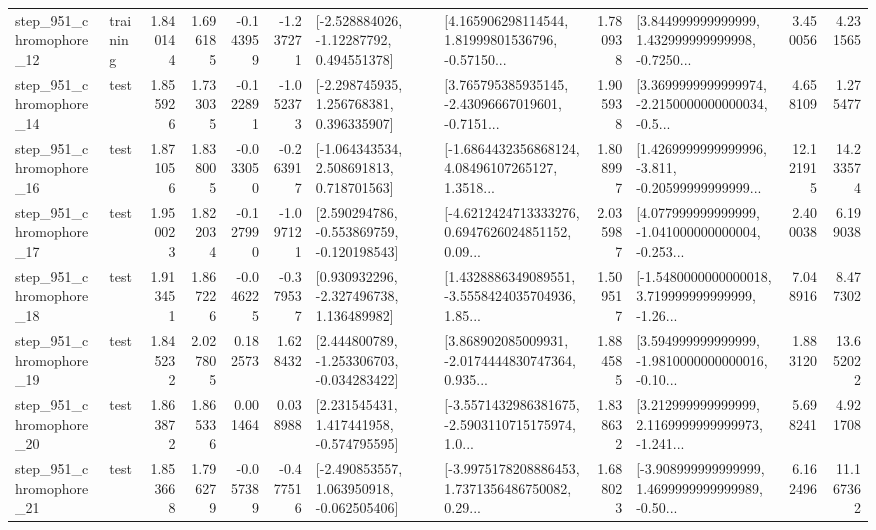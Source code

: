\begin{tabular}{llrrrrllrlrr}
  step\_951\_chromophore\_12 &  training &      1.840144 &    1.696185 &     -0.143959 & -1.237271 &    [-2.528884026, -1.12287792, 0.494551378] &  [4.165906298114544, 1.81999801536796, -0.57150... &       1.780938 &  [3.844999999999999, 1.432999999999998, -0.7250... &            3.450056 &          4.231565 \\
  step\_951\_chromophore\_14 &      test &      1.855926 &    1.733035 &     -0.122891 & -1.052373 &    [-2.298745935, 1.256768381, 0.396335907] &  [3.765795385935145, -2.43096667019601, -0.7151... &       1.905938 &  [3.3699999999999974, -2.2150000000000034, -0.5... &            4.658109 &          1.275477 \\
  step\_951\_chromophore\_16 &      test &      1.871056 &    1.838005 &     -0.033050 & -0.263917 &    [-1.064343534, 2.508691813, 0.718701563] &  [-1.6864432356868124, 4.08496107265127, 1.3518... &       1.808997 &  [1.4269999999999996, -3.811, -0.20599999999999... &           12.121915 &         14.233574 \\
  step\_951\_chromophore\_17 &      test &      1.950023 &    1.822034 &     -0.127990 & -1.097121 &   [2.590294786, -0.553869759, -0.120198543] &  [-4.6212424713333276, 0.6947626024851152, 0.09... &       2.035987 &  [4.077999999999999, -1.041000000000004, -0.253... &            2.400038 &          6.199038 \\
  step\_951\_chromophore\_18 &      test &      1.913451 &    1.867226 &     -0.046225 & -0.379537 &    [0.930932296, -2.327496738, 1.136489982] &  [1.4328886349089551, -3.5558424035704936, 1.85... &       1.509517 &  [-1.5480000000000018, 3.719999999999999, -1.26... &            7.048916 &          8.477302 \\
  step\_951\_chromophore\_19 &      test &      1.845232 &    2.027805 &      0.182573 &  1.628432 &   [2.444800789, -1.253306703, -0.034283422] &  [3.868902085009931, -2.0174444830747364, 0.935... &       1.884585 &  [3.594999999999999, -1.9810000000000016, -0.10... &            1.883120 &         13.652022 \\
  step\_951\_chromophore\_20 &      test &      1.863872 &    1.865336 &      0.001464 &  0.038988 &    [2.231545431, 1.417441958, -0.574795595] &  [-3.5571432986381675, -2.5903110715175974, 1.0... &       1.838632 &  [3.212999999999999, 2.1169999999999973, -1.241... &            5.698241 &          4.921708 \\
  step\_951\_chromophore\_21 &      test &      1.853668 &    1.796279 &     -0.057389 & -0.477516 &   [-2.490853557, 1.063950918, -0.062505406] &  [-3.9975178208886453, 1.7371356486750082, 0.29... &       1.688023 &  [-3.908999999999999, 1.4699999999999989, -0.50... &            6.162496 &         11.167362 \\

\end{tabular}
